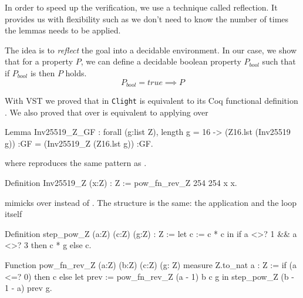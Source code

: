 In order to speed up the verification, we use a technique called reflection.
It provides us with flexibility such as we don't need to know the  number of
times the lemmas needs to be applied.

The idea is to \textit{reflect} the goal into a decidable environment.
In our case, we show that for a property $P$, we can define a decidable
boolean property $P_{bool}$ such that if $P_{bool}$ is  then $P$ holds.
$$P_{bool} = true \implies P$$

With VST we proved that  in \texttt{Clight} is equivalent to its Coq
functional definition . We also proved that 
over  is equivalent to applying
 over 


\begin{coqD}
Lemma Inv25519_Z_GF :
  forall (g:list Z),
  length g = 16 ->
  (Z16.lst (Inv25519 g)) :GF =
  (Inv25519_Z (Z16.lst g)) :GF.
\end{coqD}


where  reproduces the same pattern as .

\begin{coqD}
Definition Inv25519_Z (x:Z) : Z :=
  pow_fn_rev_Z 254 254 x x.
\end{coqD}

 mimicks  over  instead of
. The structure is the same:
the application  and the loop itself 

\begin{coqD}
Definition step_pow_Z (a:Z) (c:Z) (g:Z) : Z :=
  let c := c * c in
  if a <>? 1 && a <>? 3
    then c * g
    else c.

Function pow_fn_rev_Z (a:Z) (b:Z) (c:Z) (g: Z)
  {measure Z.to_nat a} : Z :=
  if (a <=? 0)
    then c
    else
      let prev := pow_fn_rev_Z (a - 1) b c g in
        step_pow_Z (b - 1 - a) prev g.
\end{coqD}
%

